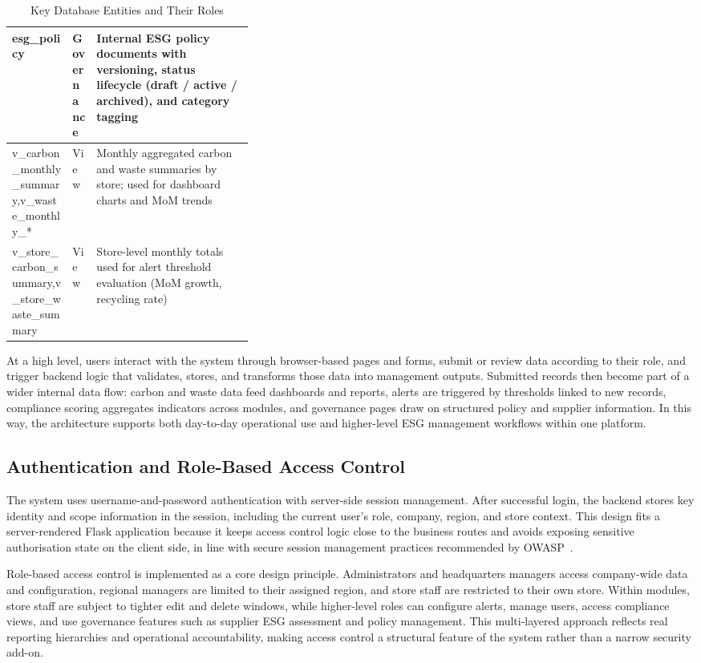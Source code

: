 \documentclass[11pt,a4paper]{article}
\begin{document}
\begin{table}[h]
\begin{tabularx}{\linewidth}{@{}>{\raggedright\arraybackslash}p{0.25\linewidth}p{0.10\linewidth}X@{}}
esg\_policy & Governance & Internal ESG policy documents with versioning, status lifecycle (draft / active / archived), and category tagging \\
\midrule
v\_carbon\_monthly\_summary,\newline v\_waste\_monthly\_* & View & Monthly aggregated carbon and waste summaries by store; used for dashboard charts and MoM trends \\
v\_store\_carbon\_summary,\newline v\_store\_waste\_summary & View & Store-level monthly totals used for alert threshold evaluation (MoM growth, recycling rate) \\
\bottomrule
\end{tabularx}
\caption{Key Database Entities and Their Roles}
\end{table}

At a high level, users interact with the system through browser-based pages and forms, submit or review data according to their role, and trigger backend logic that validates, stores, and transforms those data into management outputs. Submitted records then become part of a wider internal data flow: carbon and waste data feed dashboards and reports, alerts are triggered by thresholds linked to new records, compliance scoring aggregates indicators across modules, and governance pages draw on structured policy and supplier information. In this way, the architecture supports both day-to-day operational use and higher-level ESG management workflows within one platform.

\subsection{Authentication and Role-Based Access Control}
The system uses username-and-password authentication with server-side session management. After successful login, the backend stores key identity and scope information in the session, including the current user's role, company, region, and store context. This design fits a server-rendered Flask application because it keeps access control logic close to the business routes and avoids exposing sensitive authorisation state on the client side, in line with secure session management practices recommended by OWASP~\cite{owasp2021}.

Role-based access control is implemented as a core design principle. Administrators and headquarters managers access company-wide data and configuration, regional managers are limited to their assigned region, and store staff are restricted to their own store. Within modules, store staff are subject to tighter edit and delete windows, while higher-level roles can configure alerts, manage users, access compliance views, and use governance features such as supplier ESG assessment and policy management. This multi-layered approach reflects real reporting hierarchies and operational accountability, making access control a structural feature of the system rather than a narrow security add-on.
\end{document}
